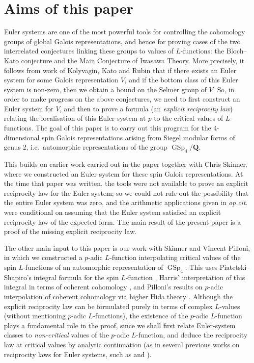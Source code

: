 \documentclass[cjm]{ipart}
\theoremstyle{plain}
\theoremstyle{remark}
\DeclareMathOperator{\GSp}{GSp}
\newcommand{\QQ}{\mathbf{Q}}
\numberwithin{equation}{subsection}
\begin{document}
 \renewcommand{\crefrangeconjunction}{--} %



\section{Aims of this paper}

 Euler systems are one of the most powerful tools for controlling the cohomology groups of global Galois representations, and hence for proving cases of the two interrelated conjectures linking these groups to values of $L$-functions: the Bloch--Kato conjecture and the Main Conjecture of Iwasawa Theory. More precisely, it follows from work of Kolyvagin, Kato and Rubin that if there exists an Euler system for some Galois representation $V$, and if the bottom class of this Euler system is non-zero, then we obtain a bound on the Selmer group of $V$. So, in order to make progress on the above conjectures, we need to first construct an Euler system for $V$, and then to prove a formula (an \emph{explicit reciprocity law}) relating the localisation of this Euler system at $p$ to the critical values of $L$-functions. The goal of this paper is to carry out this program for the 4-dimensional spin Galois representations arising from Siegel modular forms of genus 2, i.e.~automorphic representations of the group $\GSp_4 / \QQ$.

 This builds on earlier work carried out in the paper \cite{LSZ17} together with Chris Skinner, where we constructed an Euler system for these spin Galois representations. At the time that paper was written, the tools were not available to prove an explicit reciprocity law for the Euler system; so we could not rule out the possibility that the entire Euler system was zero, and the arithmetic applications given in \emph{op.cit.} were conditional on assuming that the Euler system satisfied an explicit reciprocity law of the expected form. The main result of the present paper is a proof of the missing explicit reciprocity law.

 The other main input to this paper is our work \cite{LPSZ1} with Skinner and Vincent Pilloni, in which we constructed a $p$-adic $L$-function interpolating critical values of the spin $L$-functions of an automorphic representation of $\GSp_4$. This uses Piatetski--Shapiro's integral formula for the spin $L$-function \cite{piatetskishapiro97}, Harris' interpretation of this integral in terms of coherent cohomology \cite{harris04}, and Pilloni's results on $p$-adic interpolation of coherent cohomology via higher Hida theory \cite{pilloni20}. Although the explicit reciprocity law can be formulated purely in terms of complex $L$-values (without mentioning $p$-adic $L$-functions), the existence of the $p$-adic $L$-function plays a fundamental role in the proof, since we shall first relate Euler-system classes to \emph{non-critical} values of the $p$-adic $L$-function, and deduce the reciprocity law at critical values by analytic continuation (as in several previous works on reciprocity laws for Euler systems, such as \cite{BDP13} and \cite{KLZ17}).
\end{document}
